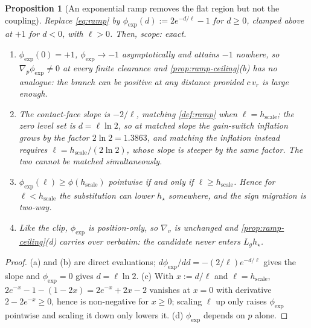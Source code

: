 \documentclass[11pt]{article}
\theoremstyle{plain}
\newtheorem{proposition}[theorem]{Proposition}
\theoremstyle{definition}
\theoremstyle{remark}
\newcommand{\Lg}{L_g}
\newcommand{\grad}{\nabla}
\newcommand{\eqdef}{:=}
\begin{document}
\begin{proposition}[An exponential ramp removes the flat region but not the coupling]\label{prop:exp-ramp}
Replace \cref{eq:ramp} by $\phi_{\exp}(d)\eqdef2e^{-d/\ell}-1$ for $d\ge0$, clamped above at
$+1$ for $d<0$, with $\ell>0$. Then, scope: exact.
\begin{enumerate}[label=(\alph*)]
  \item $\phi_{\exp}(0)=+1$, $\phi_{\exp}\to-1$ asymptotically and attains $-1$ nowhere, so
  $\grad_p\phi_{\exp}\neq0$ at every finite clearance and \cref{prop:ramp-ceiling}(b) has no
  analogue: the branch can be positive at any distance provided $c\,v_r$ is large enough.
  \item The contact-face slope is $-2/\ell$, matching \cref{def:ramp} when $\ell=h_{\mathrm{scale}}$;
  the zero level set is $d=\ell\ln2$, so at matched slope the gain-switch inflation grows by the
  factor $2\ln2=1.3863$, and matching the inflation instead requires
  $\ell=h_{\mathrm{scale}}/(2\ln2)$, whose slope is steeper by the same factor. \emph{The two
  cannot be matched simultaneously.}
  \item $\phi_{\exp}(\ell)\ge\phi(h_{\mathrm{scale}})$ pointwise if and only if
  $\ell\ge h_{\mathrm{scale}}$. Hence for $\ell<h_{\mathrm{scale}}$ the substitution can lower
  $h_\star$ somewhere, and the sign migration is two-way.
  \item Like the clip, $\phi_{\exp}$ is position-only, so $\grad_v$ is unchanged and
  \cref{prop:ramp-ceiling}(d) carries over verbatim: the candidate never enters $\Lg h_\star$.
\end{enumerate}
\end{proposition}
\begin{proof}
(a) and (b) are direct evaluations; $d\phi_{\exp}/dd=-(2/\ell)e^{-d/\ell}$ gives the slope and
$\phi_{\exp}=0$ gives $d=\ell\ln2$. (c) With $x\eqdef d/\ell$ and $\ell=h_{\mathrm{scale}}$,
$2e^{-x}-1-(1-2x)=2e^{-x}+2x-2$ vanishes at $x=0$ with derivative $2-2e^{-x}\ge0$, hence is
non-negative for $x\ge0$; scaling $\ell$ up only raises $\phi_{\exp}$ pointwise and scaling it
down only lowers it. (d) $\phi_{\exp}$ depends on $p$ alone.
\end{proof}
\end{document}
